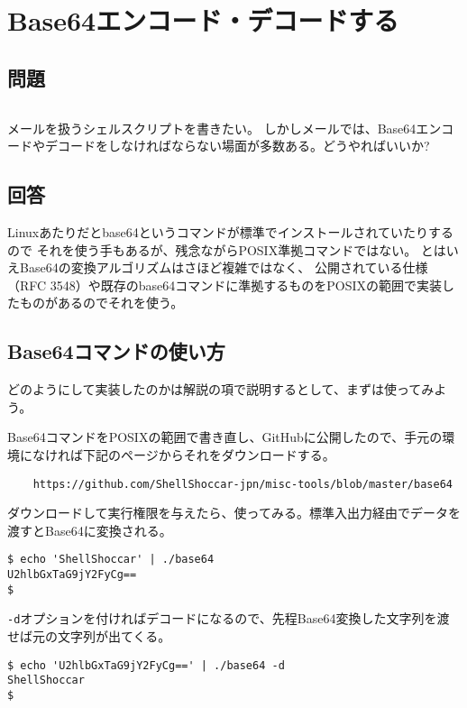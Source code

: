 \section{Base64エンコード・デコードする}
\label{recipe:Base64}

\subsection*{問題}
\noindent
$\!\!\!\!\!$
\begin{grshfboxit}{160.0mm}
	メールを扱うシェルスクリプトを書きたい。
	しかしメールでは、Base64エンコードやデコードをしなければならない場面が多数ある。どうやればいいか?
\end{grshfboxit}

\subsection*{回答}

Linuxあたりだとbase64というコマンドが標準でインストールされていたりするので
それを使う手もあるが、残念ながらPOSIX準拠コマンドではない。
とはいえBase64の変換アルゴリズムはさほど複雑ではなく、
公開されている仕様（RFC 3548）や既存のbase64コマンドに準拠するものをPOSIXの範囲で実装したものがあるのでそれを使う。

\subsection*{Base64コマンドの使い方}

どのようにして実装したのかは解説の項で説明するとして、まずは使ってみよう。

Base64コマンドをPOSIXの範囲で書き直し、GitHubに公開したので、手元の環境になければ下記のページからそれをダウンロードする。

\begin{verbatim}
	https://github.com/ShellShoccar-jpn/misc-tools/blob/master/base64
\end{verbatim}

ダウンロードして実行権限を与えたら、使ってみる。標準入出力経由でデータを渡すとBase64に変換される。
\begin{screen}
	\verb!$ echo 'ShellShoccar' | ./base64! \return    \\
	\verb|U2hlbGxTaG9jY2FyCg==|                        \\
	\verb|$ |
\end{screen}

\verb|-d|オプションを付ければデコードになるので、先程Base64変換した文字列を渡せば元の文字列が出てくる。
\begin{screen}
	\verb!$ echo 'U2hlbGxTaG9jY2FyCg==' | ./base64 -d! \return \\
	\verb|ShellShoccar|                                        \\
	\verb|$ |
\end{screen}

